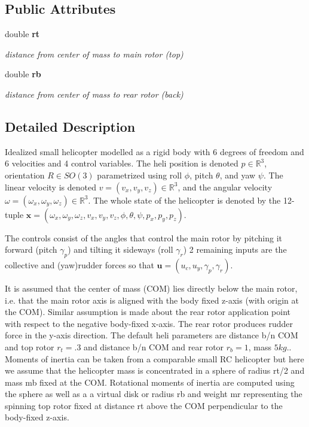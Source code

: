 \subsection*{\-Public \-Attributes}
\begin{DoxyCompactItemize}
\item 
double {\bf rt}
\begin{DoxyCompactList}\small\item\em distance from center of mass to main rotor (top) \end{DoxyCompactList}\item 
double {\bf rb}
\begin{DoxyCompactList}\small\item\em distance from center of mass to rear rotor (back) \end{DoxyCompactList}\end{DoxyCompactItemize}


\subsection{\-Detailed \-Description}
\-Idealized small helicopter modelled as a rigid body with 6 degrees of freedom and 6 velocities and 4 control variables. \-The heli position is denoted $ p \in \mathbb{R}^3 $, orientation $ R \in SO(3)$ parametrized using roll $ \phi $, pitch $ \theta $, and yaw $ \psi $. \-The linear velocity is denoted $ v=(v_x,v_y,v_z) \in \mathbb{R}^3 $, and the angular velocity $ \omega=(\omega_x,\omega_y, \omega_z) \in \mathbb{R}^3 $. \-The whole state of the helicopter is denoted by the 12-\/tuple $ \mathbf{x} = (\omega_x,\omega_y, \omega_z, v_x, v_y, v_z, \phi, \theta, \psi, p_x, p_y, p_z) $.

\-The controls consist of the angles that control the main rotor by pitching it forward (pitch $ \gamma_p $) and tilting it sideways (roll $ \gamma_r $) 2 remaining inputs are the collective and (yaw)rudder forces so that $ \mathbf{u} = (u_c, u_y, \gamma_p, \gamma_r) $.

\-It is assumed that the center of mass (\-C\-O\-M) lies directly below the main rotor, i.\-e. that the main rotor axis is aligned with the body fixed z-\/axis (with origin at the \-C\-O\-M). \-Similar assumption is made about the rear rotor application point with respect to the negative body-\/fixed x-\/axis. \-The rear rotor produces rudder force in the y-\/axis direction. \-The default heli parameters are distance b/n \-C\-O\-M and top rotor $ r_t = .3 $ and distance b/n \-C\-O\-M and rear rotor $ r_b = 1 $, mass $ 5 kg.$. \-Moments of inertia can be taken from a comparable small \-R\-C helicopter but here we assume that the helicopter mass is concentrated in a sphere of radius rt/2 and mass mb fixed at the \-C\-O\-M. \-Rotational moments of inertia are computed using the sphere as well as a a virtual disk or radius rb and weight mr representing the spinning top rotor fixed at distance rt above the \-C\-O\-M perpendicular to the body-\/fixed z-\/axis.

